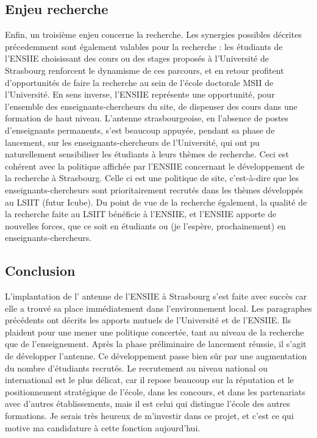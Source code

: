 \documentclass[11pt]{article}
\begin{document}
\subsection*{Enjeu recherche}
Enfin, un troisième enjeu concerne la recherche. Les synergies possibles 
décrites précedemment sont également valables pour la recherche : les étudiants
de l'ENSIIE choisissant des cours ou des stages proposés à l'Université de
Strasbourg renforcent le dynamisme de ces parcours, et en retour profitent
d'opportunités de faire la recherche au sein de l'école doctorale MSII
de l'Université. En sens inverse, l'ENSIIE représente une opportunité, pour 
l'ensemble des enseignants-chercheurs du site, de dispenser des cours dans une
formation de haut niveau. L'antenne strasbourgeoise, en l'absence de postes
d'enseignants permanents, s'est beaucoup appuyée, pendant sa phase de lancement,
sur les enseignants-chercheurs de l'Université, qui ont pu naturellement sensibiliser
les étudiants à leurs thèmes de recherche. Ceci est cohérent avec la politique 
affichée par l'ENSIIE concernant le développement de la recherche à Strasbourg.
Celle ci est une politique de site, c'est-à-dire que les enseignants-chercheurs 
sont prioritairement recrutés dans les thèmes développés au LSIIT (futur Icube).
Du point de vue de la recherche également, la qualité de la recherche faite
au LSIIT bénéficie à l'ENSIIE, et l'ENSIIE apporte de nouvelles forces, que 
ce soit en étudiants ou (je l'espère, prochainement) en enseignants-chercheurs.

 
\subsection*{Conclusion}
L'implantation de l' antenne de l'ENSIIE à Strasbourg s'est faite avec
succès car elle a trouvé sa place immédiatement dans l'environnement local.
Les paragraphes précédents ont décrits les apports mutuels de l'Université
et de l'ENSIIE. Ils plaident pour une mener une politique concertée, tant
au niveau de la recherche que de l'enseignement. Après la phase préliminaire
de lancement réussie, il s'agit de développer l'antenne. Ce développement
passe bien sûr par une augmentation du nombre d'étudiants recrutés. Le
recrutement au niveau national ou international est le plus délicat, car
il repose beaucoup sur la réputation et le positionnement stratégique
de l'école, dans les concours, et dans les partenariats avec d'autres
établissements, mais il est celui qui distingue l'école des autres 
formations. Je serais très heureux de m'investir dans ce projet, et c'est
ce qui motive ma candidature à cette fonction aujourd'hui.
\end{document}
